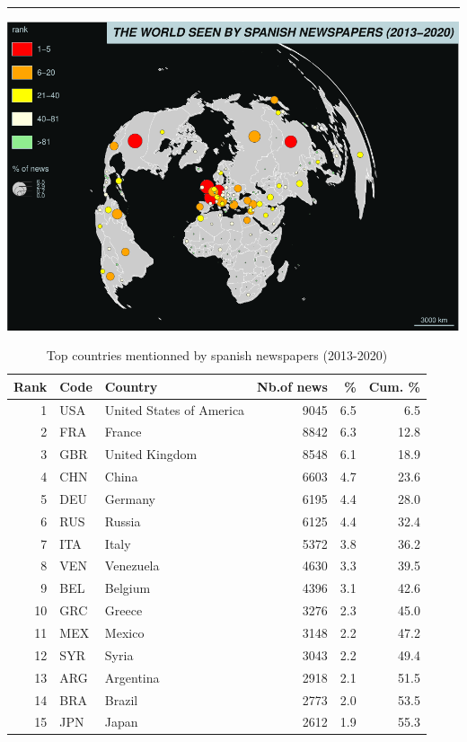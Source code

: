 \documentclass[
]{article}
\begin{document}
\begin{center}\rule{0.5\linewidth}{0.5pt}\end{center}

\includegraphics{Part2_maps_files/figure-latex/unnamed-chunk-11-1.pdf}

\begin{table}

\caption{\label{tab:unnamed-chunk-12}Top countries mentionned by spanish newspapers (2013-2020)}
\centering
\begin{tabular}[t]{r|l|l|r|r|r}
\hline
Rank & Code & Country & Nb.of news & \% & Cum. \%\\
\hline
1 & USA & United States of America & 9045 & 6.5 & 6.5\\
\hline
2 & FRA & France & 8842 & 6.3 & 12.8\\
\hline
3 & GBR & United Kingdom & 8548 & 6.1 & 18.9\\
\hline
4 & CHN & China & 6603 & 4.7 & 23.6\\
\hline
5 & DEU & Germany & 6195 & 4.4 & 28.0\\
\hline
6 & RUS & Russia & 6125 & 4.4 & 32.4\\
\hline
7 & ITA & Italy & 5372 & 3.8 & 36.2\\
\hline
8 & VEN & Venezuela & 4630 & 3.3 & 39.5\\
\hline
9 & BEL & Belgium & 4396 & 3.1 & 42.6\\
\hline
10 & GRC & Greece & 3276 & 2.3 & 45.0\\
\hline
11 & MEX & Mexico & 3148 & 2.2 & 47.2\\
\hline
12 & SYR & Syria & 3043 & 2.2 & 49.4\\
\hline
13 & ARG & Argentina & 2918 & 2.1 & 51.5\\
\hline
14 & BRA & Brazil & 2773 & 2.0 & 53.5\\
\hline
15 & JPN & Japan & 2612 & 1.9 & 55.3\\
\hline
\end{tabular}
\end{table}
\end{document}
